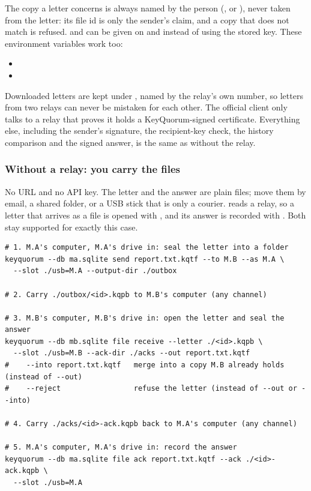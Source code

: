 The copy a letter concerns is always named by the person
(,  or ), never taken from the letter:
its file id is only the sender's claim, and a copy that does not match is
refused.  and  can be given on  and
 instead of using the stored key. These environment variables work
too:

\begin{itemize}[leftmargin=1.5em]
  \item {}
  \item {}
\end{itemize}

Downloaded letters are kept under , named
by the relay's own number, so letters from two relays can never be mistaken
for each other. The official client only talks to a relay that proves it holds
a KeyQuorum-signed certificate. Everything else, including the sender's
signature, the recipient-key check, the history comparison and the signed
answer, is the same as without the relay.

\subsubsection*{Without a relay: you carry the files}

No URL and no API key. The letter and the answer are plain files; move them
by email, a shared folder, or a USB stick that is only a courier.
 reads a relay, so a letter that arrives as a file is opened with
, and its answer is recorded with . Both
stay supported for exactly this case.

\begin{lstlisting}
# 1. M.A's computer, M.A's drive in: seal the letter into a folder
keyquorum --db ma.sqlite send report.txt.kqtf --to M.B --as M.A \
  --slot ./usb=M.A --output-dir ./outbox

# 2. Carry ./outbox/<id>.kqpb to M.B's computer (any channel)

# 3. M.B's computer, M.B's drive in: open the letter and seal the answer
keyquorum --db mb.sqlite file receive --letter ./<id>.kqpb \
  --slot ./usb=M.B --ack-dir ./acks --out report.txt.kqtf
#    --into report.txt.kqtf   merge into a copy M.B already holds (instead of --out)
#    --reject                 refuse the letter (instead of --out or --into)

# 4. Carry ./acks/<id>-ack.kqpb back to M.A's computer (any channel)

# 5. M.A's computer, M.A's drive in: record the answer
keyquorum --db ma.sqlite file ack report.txt.kqtf --ack ./<id>-ack.kqpb \
  --slot ./usb=M.A
\end{lstlisting}

